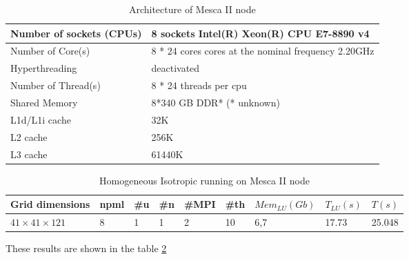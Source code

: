 \begin{table}[!h]
\centering
\begin{tabular}{|l|l|}
\hline
Number of sockets (CPUs) & 8 sockets Intel(R) Xeon(R) CPU E7-8890 v4 	\\	
\hline
Number of Core(s) & 8 * 24 cores cores at the nominal frequency 2.20GHz	\\	
\hline
Hyperthreading & deactivated			\\
\hline
Number of Thread(s) &  8 * 24 threads per cpu	\\
\hline
Shared Memory & 8*340 GB DDR*  (* unknown)   \\	
\hline		
L1d/L1i cache &         32K	\\		
\hline
L2 cache &              256K	\\	
\hline	
L3 cache &              61440K	\\
\hline
\end{tabular}
\caption{Architecture of Mesca II node}
\label{mescaNode}
\end{table}

\begin{table}[!h]
\centering

\begin{tabular}{lllllllll}
Grid dimensions & npml & \#u & \#n & \#MPI & \#th & $Mem_{LU}(Gb)$ & $T_{LU}(s)$ & $T(s)$ \\
 \hline
$41 \times 41 \times 121$ & 8 & 1 & 1 & 2  & 10 & 6,7 &  17.73 & 25.048 
\end{tabular}
\caption{Homogeneous Isotropic running on Mesca II node}
\label{Mesca1}
\end{table}
These results are shown in the table \ref{Mesca1}

